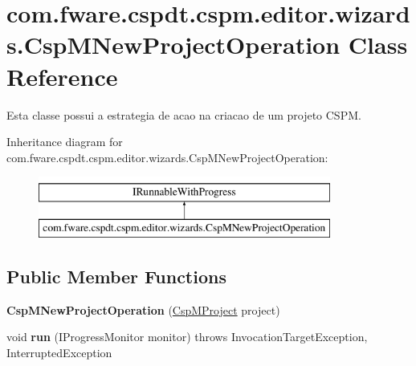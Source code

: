 \hypertarget{classcom_1_1fware_1_1cspdt_1_1cspm_1_1editor_1_1wizards_1_1_csp_m_new_project_operation}{}\section{com.\+fware.\+cspdt.\+cspm.\+editor.\+wizards.\+Csp\+M\+New\+Project\+Operation Class Reference}
\label{classcom_1_1fware_1_1cspdt_1_1cspm_1_1editor_1_1wizards_1_1_csp_m_new_project_operation}


Esta classe possui a estrategia de acao na criacao de um projeto C\+S\+PM.  


Inheritance diagram for com.\+fware.\+cspdt.\+cspm.\+editor.\+wizards.\+Csp\+M\+New\+Project\+Operation\+:\begin{figure}[H]
\begin{center}
\leavevmode
\includegraphics[height=2.000000cm]{classcom_1_1fware_1_1cspdt_1_1cspm_1_1editor_1_1wizards_1_1_csp_m_new_project_operation}
\end{center}
\end{figure}
\subsection*{Public Member Functions}
\begin{DoxyCompactItemize}
\item 
\mbox{\label{classcom_1_1fware_1_1cspdt_1_1cspm_1_1editor_1_1wizards_1_1_csp_m_new_project_operation_a8b598835e519b577b22022e29f77f7fa}} 
{\bfseries Csp\+M\+New\+Project\+Operation} (\hyperlink{classcom_1_1fware_1_1cspdt_1_1cspm_1_1editor_1_1project_1_1_csp_m_project}{Csp\+M\+Project} project)
\item 
\mbox{\label{classcom_1_1fware_1_1cspdt_1_1cspm_1_1editor_1_1wizards_1_1_csp_m_new_project_operation_a7d04424b0b5d471feab7ac517b807c0c}} 
void {\bfseries run} (I\+Progress\+Monitor monitor)  throws Invocation\+Target\+Exception, Interrupted\+Exception 
\end{DoxyCompactItemize}


